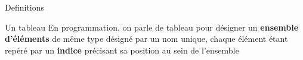 \begin{frame}{Definitions}
    \pause
    \begin{block}{Un tableau}
        En programmation,
        on parle de tableau pour d\'esigner un \textbf{ensemble d'\'el\'ements} de m\^eme type d\'esign\'e par un nom unique,
        chaque \'el\'ement \'etant rep\'er\'e par un \textbf{indice} pr\'ecisant sa position au sein de l'ensemble
    \end{block}
\end{frame}